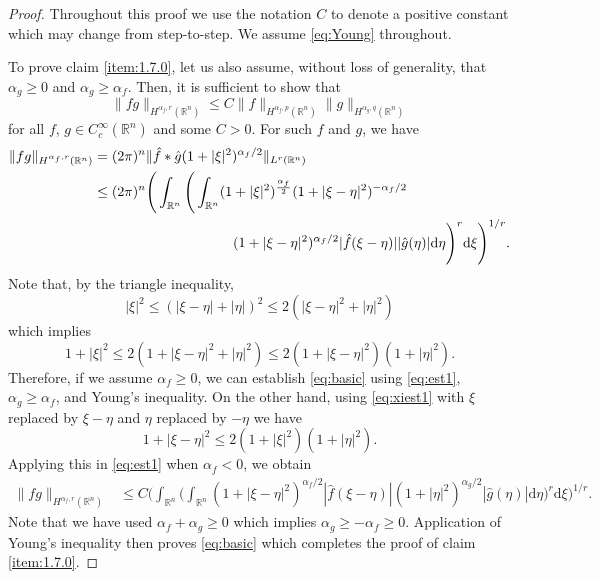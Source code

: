 \documentclass[a4paper,12pt]{amsart}
\numberwithin{equation}{section}
\theoremstyle{plain}
\numberwithin{theorem}{section}
\theoremstyle{definition}
\theoremstyle{remark}
\theoremstyle{remark}
\theoremstyle{remark}
\newcommand{\dd}{\mathrm{d}}  %
\begin{document}
\begin{proof}
    Throughout this proof we use the notation $C$ to denote a positive constant which may change from step-to-step. We assume \eqref{eq:Young} throughout.
    
    To prove claim \ref{item:1.7.0}, let us also assume, without loss of generality, that $\alpha_g \geq 0$ and $\alpha_g \geq \alpha_f$. Then, it is sufficient to show that
    \begin{equation}
        \label{eq:basic}
    \|fg\|_{H^{\alpha_f,r}(\mathbb{R}^n)} \leq C \|f\|_{H^{\alpha_f,p}(\mathbb{R}^n)} \|g\|_{H^{\alpha_g,q}(\mathbb{R}^n)}
    \end{equation}
    for all $f$, $g \in C_c^\infty(\mathbb{R}^n)$ and some $C>0$. For such $f$ and $g$, we have
    \begin{equation}\label{eq:est1}
    \begin{split}
    \|f g\|_{H^{\alpha_f,r}(\mathbb{R}^n)} & = (2 \pi)^n \|\hat{f}\ast \hat{g}(1+|\xi|^2)^{\alpha_f/2}\|_{L^r(\mathbb{R}^n)}\\
    & \leq (2\pi)^n  \Bigg (\int_{\mathbb{R}^n} \Bigg ( \int_{\mathbb{R}^n} (1+|\xi|^2)^{\frac{\alpha_f}{2}} (1+ |\xi-\eta|^2)^{-\alpha_f/2}\\ 
    & \hskip10em (1+ |\xi-\eta|^2)^{\alpha_f/2}|\hat{f}(\xi-\eta)| |\hat{g}(\eta)| \dd \eta \Bigg )^r \dd \xi \Bigg )^{1/r}.
    \end{split}
    \end{equation}
    Note that, by the triangle inequality,
    \[
    |\xi|^2\leq (|\xi-\eta| + |\eta|)^2 \leq 2 (|\xi-\eta|^2 + |\eta|^2)
    \]
    which implies
    \begin{equation}\label{eq:xiest1}
    1 + |\xi|^2 \leq 2(1+ |\xi-\eta|^2 + |\eta|^2) \leq 2 (1 + |\xi-\eta|^2) (1+ |\eta|^2).
    \end{equation}
    Therefore, if we assume $\alpha_f \geq 0$, we can establish \eqref{eq:basic} using \eqref{eq:est1}, $\alpha_g \geq \alpha_f$, and Young's inequality. On the other hand, using \eqref{eq:xiest1} with $\xi$ replaced by $\xi-\eta$ and $\eta$ replaced by $-\eta$ we have
    \begin{equation}\label{eq:xietaest}
    1+ |\xi-\eta|^2 \leq 2 (1+ |\xi|^2)(1+|\eta|^2).
    \end{equation}
    Applying this in \eqref{eq:est1} when $\alpha_f<0$, we obtain
    \[
    \begin{split}
    \|f g\|_{H^{\alpha_f,r}(\mathbb{R}^n)} & \leq C \Bigg (\int_{\mathbb{R}^n} \Bigg ( \int_{\mathbb{R}^n}(1+ |\xi-\eta|^2)^{\alpha_f/2}|\hat{f}(\xi-\eta)| (1+|\eta|^2)^{\alpha_g/2} |\hat{g}(\eta)| \dd \eta \Bigg )^r \dd \xi \Bigg )^{1/r}.
    \end{split}
    \]
    Note that we have used $\alpha_f + \alpha_g \geq 0$ which implies $\alpha_g \geq - \alpha_f \geq 0$. Application of Young's inequality then proves \eqref{eq:basic} which completes the proof of claim \eqref{item:1.7.0}.
    

\end{proof}
\end{document}
